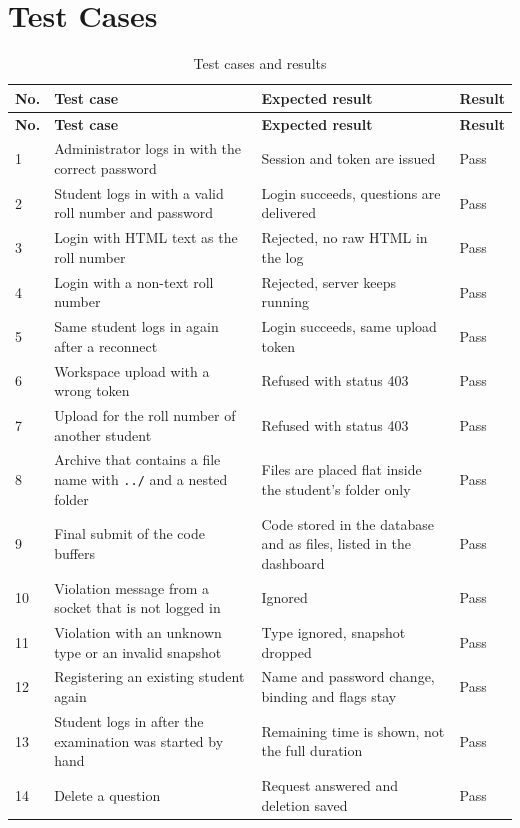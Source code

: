 \documentclass[12pt,a4paper]{report}
\begin{document}
\section{Test Cases}
{\footnotesize\begin{longtable}{@{}C{0.8cm} L{5.5cm} L{4.2cm} C{1.1cm}@{}}
\caption{Test cases and results}\label{tab:cases}\\
\toprule
\textbf{No.} & \textbf{Test case} & \textbf{Expected result} & \textbf{Result}\\
\midrule
\endfirsthead
\toprule
\textbf{No.} & \textbf{Test case} & \textbf{Expected result} & \textbf{Result}\\
\midrule
{} & Administrator logs in with the correct password & Session and token are issued & Pass\\
2 & Student logs in with a valid roll number and password & Login succeeds, questions are delivered & Pass\\
3 & Login with HTML text as the roll number & Rejected, no raw HTML in the log & Pass\\
4 & Login with a non-text roll number & Rejected, server keeps running & Pass\\
5 & Same student logs in again after a reconnect & Login succeeds, same upload token & Pass\\
6 & Workspace upload with a wrong token & Refused with status 403 & Pass\\
7 & Upload for the roll number of another student & Refused with status 403 & Pass\\
8 & Archive that contains a file name with \texttt{../} and a nested folder & Files are placed flat inside the student's folder only & Pass\\
9 & Final submit of the code buffers & Code stored in the database and as files, listed in the dashboard & Pass\\
10 & Violation message from a socket that is not logged in & Ignored & Pass\\
11 & Violation with an unknown type or an invalid snapshot & Type ignored, snapshot dropped & Pass\\
12 & Registering an existing student again & Name and password change, binding and flags stay & Pass\\
13 & Student logs in after the examination was started by hand & Remaining time is shown, not the full duration & Pass\\
14 & Delete a question & Request answered and deletion saved & Pass\\

\end{longtable}}
\end{document}
